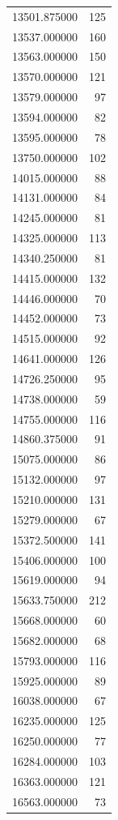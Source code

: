 \begin{tabular}{lr}
13501.875000  &   125 \\
13537.000000  &   160 \\
13563.000000  &   150 \\
13570.000000  &   121 \\
13579.000000  &    97 \\
13594.000000  &    82 \\
13595.000000  &    78 \\
13750.000000  &   102 \\
14015.000000  &    88 \\
14131.000000  &    84 \\
14245.000000  &    81 \\
14325.000000  &   113 \\
14340.250000  &    81 \\
14415.000000  &   132 \\
14446.000000  &    70 \\
14452.000000  &    73 \\
14515.000000  &    92 \\
14641.000000  &   126 \\
14726.250000  &    95 \\
14738.000000  &    59 \\
14755.000000  &   116 \\
14860.375000  &    91 \\
15075.000000  &    86 \\
15132.000000  &    97 \\
15210.000000  &   131 \\
15279.000000  &    67 \\
15372.500000  &   141 \\
15406.000000  &   100 \\
15619.000000  &    94 \\
15633.750000  &   212 \\
15668.000000  &    60 \\
15682.000000  &    68 \\
15793.000000  &   116 \\
15925.000000  &    89 \\
16038.000000  &    67 \\
16235.000000  &   125 \\
16250.000000  &    77 \\
16284.000000  &   103 \\
16363.000000  &   121 \\
16563.000000  &    73 \\

\end{tabular}
